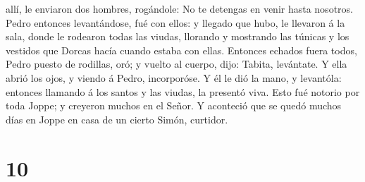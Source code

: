 allí, le enviaron dos hombres, rogándole: No te detengas en venir hasta
nosotros.  Pedro entonces levantándose, fué con ellos: y
llegado que hubo, le llevaron á la sala, donde le rodearon todas las
viudas, llorando y mostrando las túnicas y los vestidos que Dorcas hacía
cuando estaba con ellas.  Entonces echados fuera todos,
Pedro puesto de rodillas, oró; y vuelto al cuerpo, dijo: Tabita,
levántate. Y ella abrió los ojos, y viendo á Pedro, incorporóse.
 Y él le dió la mano, y levantóla: entonces llamando á
los santos y las viudas, la presentó viva.  Esto fué
notorio por toda Joppe; y creyeron muchos en el Señor.  Y
aconteció que se quedó muchos días en Joppe en casa de un cierto Simón,
curtidor.

\hypertarget{section-9}{%
\section{10}\label{section-9}}

